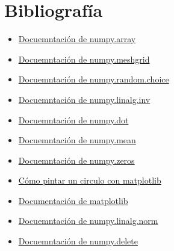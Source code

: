 \chapter{Bibliografía}
\begin{itemize}

   \item \href{https://docs.scipy.org/doc/numpy/reference/generated/numpy.array.html}{Docuemntación de numpy.array}
   \item \href{https://docs.scipy.org/doc/numpy/reference/generated/numpy.meshgrid.html}{Docuemntación de numpy.meshgrid}
   \item \href{https://docs.scipy.org/doc/numpy-1.13.0/reference/generated/numpy.random.choice.html}{Docuemntación de numpy.random.choice}
   \item \href{https://docs.scipy.org/doc/numpy/reference/generated/numpy.linalg.inv.html}{Docuemntación de numpy.linalg.inv}
   \item \href{https://docs.scipy.org/doc/numpy/reference/generated/numpy.dot.html}{Docuemntación de numpy.dot}
   \item \href{https://het.as.utexas.edu/HET/Software/Numpy/reference/generated/numpy.mean.html#numpy.mean}{Docuemntación de numpy.mean}
   \item \href{https://docs.scipy.org/doc/numpy/reference/generated/numpy.zeros.html#numpy.zeros}{Docuemntación de numpy.zeros}
   \item \href{https://stackoverflow.com/questions/32092899/plot-equation-showing-a-circle}{Cómo pintar un circulo con matplotlib}
   \item \href{https://matplotlib.org/}{Documentación de matplotlib}
   \item \href{https://docs.scipy.org/doc/numpy/reference/generated/numpy.linalg.norm.html}{Docuemntación de numpy.linalg.norm}
   \item \href{https://docs.scipy.org/doc/numpy/reference/generated/numpy.delete.html}{Docuemntación de numpy.delete}

\end{itemize}
